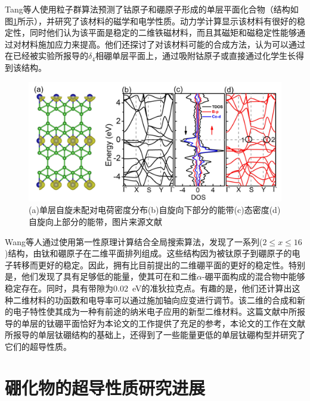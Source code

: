 Tang等人\cite{tang2019cob}使用粒子群算法预测了钴原子和硼原子形成的单层平面化合物（结构如图\ref{fig:ch1_cob6}所示），并研究了该材料的磁学和电学性质。动力学计算显示该材料有很好的稳定性，同时他们认为该平面是稳定的二维铁磁材料，而且其磁矩和磁稳定性能够通过对材料施加应力来提高。他们还探讨了对该材料可能的合成方法，认为可以通过在已经被实验所报导的$\delta_4$相硼单层平面上，通过吸附钴原子或直接通过化学生长得到该结构。

\begin{figure}[bt]
  \includegraphics[width=1.0\textwidth]{figs/ch1_cob6.png}
  \centering
  \caption{(a)单层自旋未配对电荷密度分布(b)自旋向下部分的能带(c)态密度(d)自旋向上部分的能带，图片来源文献\cite{tang2019cob}}
  \label{fig:ch1_cob6}
\end{figure}

Wang等人\cite{wang2017semimetallic}通过使用第一性原理计算结合全局搜索算法，发现了一系列($2\leq x\leq 16$)结构，由钛和硼原子在二维平面排列组成。这些结构因为被钛原子到硼原子的电子转移而更好的稳定。因此，拥有比目前提出的二维硼平面的更好的稳定性。特别是，他们发现了具有足够低的能量，使其可在和二维$\alpha$-硼平面构成的混合物中能够稳定存在。同时，具有带隙为\SI{0.02}{\eV}的准狄拉克点。有趣的是，他们还计算出这种二维材料的功函数和电导率可以通过施加轴向应变进行调节。该二维的合成和新的电子特性使其成为一种有前途的纳米电子应用的新型二维材料。这篇文献中所报导的单层的钛硼平面恰好为本论文的工作提供了充足的参考，本论文的工作在文献所报导的单层钛硼结构的基础上，还得到了一些能量更低的单层钛硼构型并研究了它们的超导性质。


\section{硼化物的超导性质研究进展}

